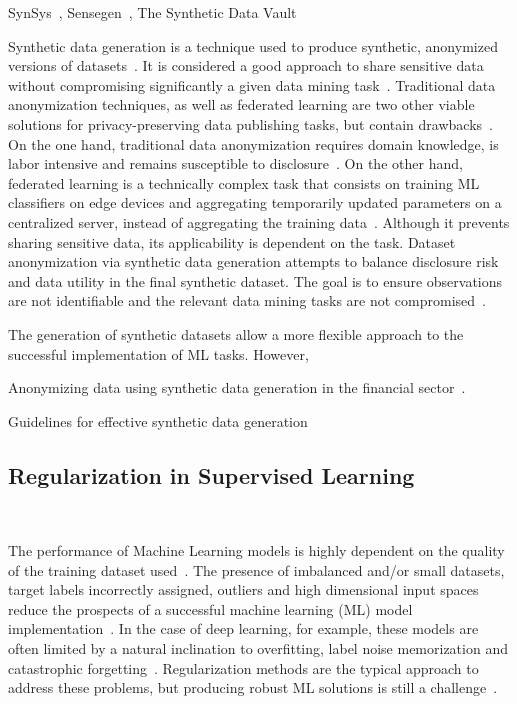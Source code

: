 \documentclass[parskip=full]{scrartcl}
\begin{document}
SynSys~\cite{dahmen2019synsys}, Sensegen~\cite{alzantot2017sensegen}, The
Synthetic Data Vault~\cite{patki2016synthetic}

Synthetic data generation is a technique used to produce synthetic, anonymized
versions of datasets~\cite{dankar2021fake}. It is considered a good approach
to share sensitive data without compromising significantly a given data mining
task~\cite{taub2018differential, park2018data}. Traditional data anonymization
techniques, as well as federated learning are two other viable solutions for
privacy-preserving data publishing tasks, but contain
drawbacks~\cite{hernandez2022synthetic}. On the one hand, traditional data
anonymization requires domain knowledge, is labor intensive and remains
susceptible to disclosure~\cite{reiter2004new}. On the other hand, federated
learning is a technically complex task that consists on training ML
classifiers on edge devices and aggregating temporarily updated parameters on
a centralized server, instead of aggregating the training
data~\cite{yu2022survey}. Although it prevents sharing sensitive data, its
applicability is dependent on the task. Dataset anonymization via synthetic
data generation attempts to balance disclosure risk and data utility in the
final synthetic dataset. The goal is to ensure observations are not
identifiable and the relevant data mining tasks are not
compromised~\cite{singh2017aggregating, li2018privacy}.

The generation of synthetic datasets allow a more flexible approach to the
successful implementation of ML tasks. However,

Anonymizing data using synthetic data generation in the financial
sector~\cite{assefa2020generating}.

Guidelines for effective synthetic data generation~\cite{dankar2021fake}





\subsection{Regularization in Supervised Learning}~\label{sec:regularization}

The performance of Machine Learning models is highly dependent on the quality
of the training dataset used~\cite{Fenza2021, Halevy2009}. The presence of
imbalanced and/or small datasets, target labels incorrectly assigned, outliers
and high dimensional input spaces reduce the prospects of a successful machine
learning (ML) model implementation~\cite{Halevy2009, Domingos2012,
Salman2019}. In the case of deep learning, for example, these
models are often limited by a natural inclination to overfitting, label noise
memorization and catastrophic forgetting~\cite{Xie2021}. Regularization
methods are the typical approach to address these problems, but producing
robust ML solutions is still a challenge~\cite{Zhang2021}.
\end{document}
